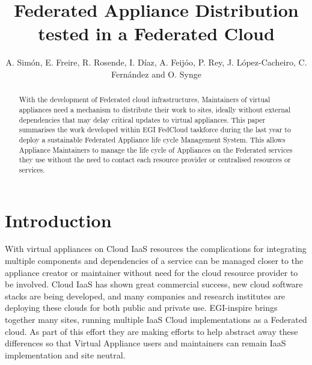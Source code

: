 \documentclass{llncs_Ibergrid2013}
\begin{document}
%
\frontmatter          %
%
\pagestyle{headings}  %
%
\mainmatter              %
%
\title{Federated Appliance Distribution tested in a Federated Cloud}
%
%
\author{A. Sim\'on, E. Freire, R. Rosende, I. D\'iaz, A. Feij\'oo, P. Rey, J. L\'opez-Cacheiro, C. Fern\'andez and O. Synge}
%
%
%




\maketitle              %

\begin{abstract}
With the development of Federated cloud infrastructures, Maintainers of virtual appliances need a mechanism to distribute their work to sites, ideally without external dependencies that may delay critical updates to virtual appliances. This paper summarises the work developed within EGI FedCloud taskforce during the last year to deploy a sustainable Federated Appliance life cycle Management System. This allows Appliance Maintainers to manage the life cycle of Appliances on the Federated services they use without the need to contact each resource provider or centralised resources or services.
\end{abstract}

%
\section{Introduction}
\label{sect-introduction}
%
With virtual appliances on Cloud IaaS resources the complications for integrating multiple components and dependencies of a service can be managed closer to the appliance creator or maintainer without need for the cloud resource provider to be involved. Cloud IaaS has shown great commercial success, new cloud software stacks are being developed, and many companies and research institutes are deploying these clouds for both public and private use. EGI-inspire brings together many sites, running multiple IaaS Cloud implementations as a Federated cloud. As part of this effort they are making efforts to help abstract away these differences so that Virtual Appliance users and maintainers can remain IaaS implementation and site neutral.
\end{document}

